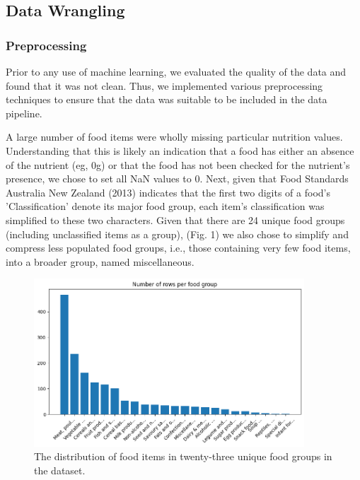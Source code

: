 \documentclass[11pt]{article}
\begin{document}
\subsection{Data Wrangling}

\subsubsection{Preprocessing}

Prior to any use of machine learning, we evaluated  the quality of the data and found that it was not clean. Thus, we implemented various preprocessing techniques to ensure that the data was suitable to be included in the data pipeline. 


A large number of food items were wholly missing particular nutrition values. Understanding that this is likely an indication that a food has either an absence of the nutrient (eg, 0g) or that the food has not been checked for the nutrient's presence, we chose to set all NaN values to 0. Next, given that Food Standards Australia New Zealand (2013) indicates that the first two digits of a food's 'Classification' denote its major food group, each item's classification was simplified to these two characters. Given that there are 24 unique food groups (including unclassified items as a group), (Fig. 1) we also chose to simplify and compress less populated food groups, i.e., those containing very few food items, into a broader group, named miscellaneous. 

\begin{figure}[htbp]
    \centering
    \includegraphics[width=0.9\textwidth]{report/figs/number-of-rows-per-food-group.png}
    \caption{The distribution of food items in twenty-three unique food groups in the \cite{FoodStandardsAustraliaNewZealand} dataset.}
    \label{fig:food-group-distribution}
\end{figure}
\end{document}
